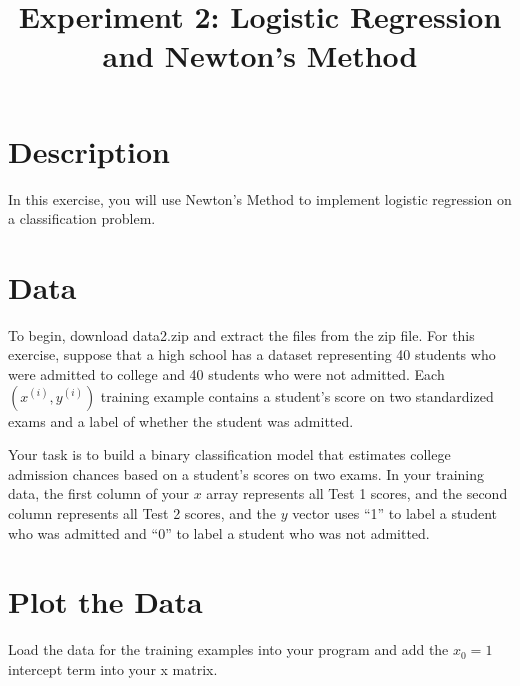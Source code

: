 \documentclass[10pt,a4paper]{article}
\begin{document}
\title{Experiment 2: Logistic Regression and Newton's Method}

\maketitle
  
\section{Description}
%
  In this exercise, you will use Newton's Method to implement logistic regression on a classification problem.



\section{Data}
%
  To begin, download data2.zip and extract the files from the zip file. For this exercise, suppose that a high school has a dataset representing 40 students who were admitted to college and 40 students who were not admitted. Each $(x^{(i)}, y^{(i)})$ training example contains a student's score on two standardized exams and a label of whether the student was admitted.

  Your task is to build a binary classification model that estimates college admission chances based on a student's scores on two exams. In your training data, the first column of your $x$ array represents all Test 1 scores, and the second column represents all Test 2 scores, and the $y$ vector uses ``1'' to label a student who was admitted and ``0'' to label a student who was not admitted.




\section{Plot the Data}
%
  Load the data for the training examples into your program and add the $x_0 = 1$ intercept term into your x matrix.
\end{document}
